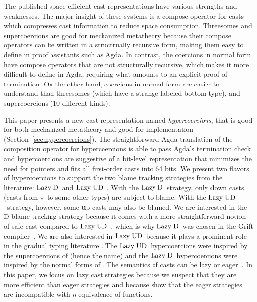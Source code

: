 \documentclass[runningheads]{llncs}
\newcommand{\LUD}{\ensuremath{\text{Lazy\;UD}}}
\newcommand{\LD}{\ensuremath{\text{Lazy\;D}}}
\newcommand{\Tdyn}[0]{\ensuremath{\star}}
\begin{document}
The published space-efficient cast representations have various
strengths and weaknesses.  The major insight of these systems is a
compose operator for casts which compresses cast information to reduce
space consumption.  Threesomes and supercoercions are good for
mechanized metatheory because their compose operators 
can be written in a structrually recursive form,
making them easy to define in proof assistants such as
Agda. In contrast, the coercions in normal form have compose operators
that are not structurally recursive, which makes it more difficult to
define in Agda, requiring what amounts to an explicit proof of
termination.
%
On the other hand, coercions in normal form are easier to understand
than threesomes (which have a strange labeled bottom type), and
supercoercions (10 different kinds).

This paper presents a new cast representation named
\emph{hypercoercions}, that is good for both mechanized metatheory and
good for implementation (Section~\ref{sec:hypercoercions}). The
straightforward Agda translation of the composition operator for
hypercoercions is able to pass Agda's termination check and
hypercoercions are suggestive of a bit-level representation that
minimizes the need for pointers and fits all first-order casts into 64
bits.
%
We present two flavors of hypercoercions to support the two blame
tracking strategies from the literature: \LD\ and
\LUD~\citep{siek2009exploring}. With the \LD\ strategy, only 
\textbf{d}own 
casts (casts from \Tdyn\ to some other types) are subject to blame. 
With the 
\LUD\
strategy, however, some \textbf{u}p casts may also be blamed.
We are interested in the D blame
tracking strategy because it comes with a more straightforward notion of
safe cast compared to \LUD~\citep{siek2009exploring}, which is why \LD\ 
was
chosen in the Grift compiler~\citep{kuhlenschmidt2018efficient}. We are also 
interested in \LUD\ because it plays a
prominent role in the gradual typing literature
\citep{wadler2009well}.  The \LUD\ hypercoercions were inspired by the
supercoercions of \citep{Garcia:2013:CTB:2500365.2500603} (hence the name) and
the \LD\ hypercoercions were inspired by the normal forms of
\citet{siek2012interpretations}.
The semantics of casts can be lazy or
eager~\citep{siek2009exploring}. In this paper, we focus on lazy cast
strategies because we suspect that they are more efficient than eager
strategies and because \citet{new2019gradual} show that the eager
strategies are incompatible with $\eta$-equivalence of functions.
\end{document}
